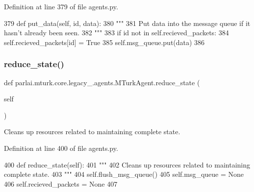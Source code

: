 Definition at line 379 of file agents.\+py.


\begin{DoxyCode}
379     \textcolor{keyword}{def }put\_data(self, id, data):
380         \textcolor{stringliteral}{"""}
381 \textcolor{stringliteral}{        Put data into the message queue if it hasn't already been seen.}
382 \textcolor{stringliteral}{        """}
383         \textcolor{keywordflow}{if} id \textcolor{keywordflow}{not} \textcolor{keywordflow}{in} self.recieved\_packets:
384             self.recieved\_packets[id] = \textcolor{keyword}{True}
385             self.msg\_queue.put(data)
386 
\end{DoxyCode}
\mbox{\label{classparlai_1_1mturk_1_1core_1_1legacy__2018_1_1agents_1_1MTurkAgent_ad6b25298f44461404805c398c3f08ac5}} 
\subsubsection{\texorpdfstring{reduce\+\_\+state()}{reduce\_state()}}
{\footnotesize\ttfamily def parlai.\+mturk.\+core.\+legacy\+\_.\+agents.\+M\+Turk\+Agent.\+reduce\+\_\+state (\begin{DoxyParamCaption}\item[{}]{self }\end{DoxyParamCaption})}

\begin{DoxyVerb}Cleans up resources related to maintaining complete state.
\end{DoxyVerb}
 

Definition at line 400 of file agents.\+py.


\begin{DoxyCode}
400     \textcolor{keyword}{def }reduce\_state(self):
401         \textcolor{stringliteral}{"""}
402 \textcolor{stringliteral}{        Cleans up resources related to maintaining complete state.}
403 \textcolor{stringliteral}{        """}
404         self.flush\_msg\_queue()
405         self.msg\_queue = \textcolor{keywordtype}{None}
406         self.recieved\_packets = \textcolor{keywordtype}{None}
407 
\end{DoxyCode}
\mbox{\label{classparlai_1_1mturk_1_1core_1_1legacy__2018_1_1agents_1_1MTurkAgent_a9343b55ce980daa021253197a1852668}} 
